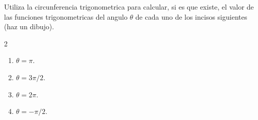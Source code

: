 \documentclass[12pt,a4paper]{article}
\begin{document}
    \begin{mdframed}[style=mdbluebox,frametitle={Ejercicio 7}]
        Utiliza la circunferencia trigonometrica para calcular, si es que existe, el valor de las funciones trigonometricas del angulo
        $\theta$ de cada uno de los incisos siguientes (haz un dibujo).
        \begin{multicols}{2}
            \begin{enumerate}
                \item[(a)]  $\theta=\pi.$
                \item[(b)]  $\theta=3\pi/2.$
                \item[(c)]  $\theta=2\pi.$
                \item[(d)]  $\theta=-\pi/2.$
            \end{enumerate}
        \end{multicols}
    \end{mdframed}
\end{document}
